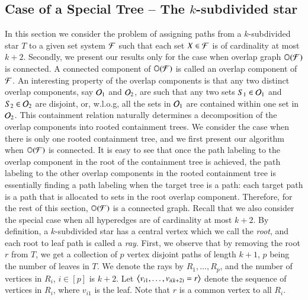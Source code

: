 \documentclass[MS,synopsis]{iitmdiss}
\begin{document}
\subsection{Case of a Special Tree -- The $k$-subdivided star}
\label{sec:ksubdivstar}
In this section we consider the problem of assigning paths from a
$k$-subdivided star $T$ to a given set system ${\cal F}$ such that each set
$X \in {\cal F}$ is of cardinality at most $k+2$.  Secondly, we present our
results only for the case when overlap graph $\mathbb O({\cal F})$ is connected.
A connected component of $\mathbb O({\cal F})$ is called an overlap component of
${\cal F}$.  An interesting property of the overlap components is that any
two distinct overlap components, say ${\cal O}_1$ and ${\cal O}_2$, are such
that any two sets $S_1 \in {\cal O}_1$ and $S_2 \in {\cal O}_2$ are disjoint,
or, w.l.o.g, all the sets in ${\cal O}_1$ are contained within one set in
${\cal O}_2$.  This containment relation naturally determines a
decomposition of the overlap components into rooted containment trees.
We consider the case when there is only one rooted containment tree,
and we first present our algorithm when $\mathbb O({\cal F})$ is connected.  It
is easy to see that once the path labeling to the overlap component in
the root of the containment tree is achieved, the path labeling to the
other overlap components in the rooted containment tree is essentially
finding a path labeling when the target tree is a path: each target
path is a path that is allocated to sets in the root overlap
component.  Therefore, for the rest of this section, $\mathbb O({\cal F})$ is a
connected graph. Recall that we also consider the special case when
all hyperedges are of cardinality at most $k+2$.  By definition, a
$k$-subdivided star has a central vertex which we call the {\em root},
and each root to leaf path is called a {\em ray}.  First, we observe
that by removing the root $r$ from $T$, we get a collection of $p$
vertex disjoint paths of length $k+1$, $p$ being the number of leaves
in $T$.  We denote the rays by $R_1, \ldots, R_p$, and the number of
vertices in $R_i$, $i \in [p]$ is $k+2$.  Let
$\left\langle v_{i1},\ldots,v_{i(k+2)}=r \right\rangle$ denote the sequence of vertices in
$R_i$, where $v_{i1}$ is the leaf. Note that $r$ is a common vertex to
all $R_i$.
\end{document}
